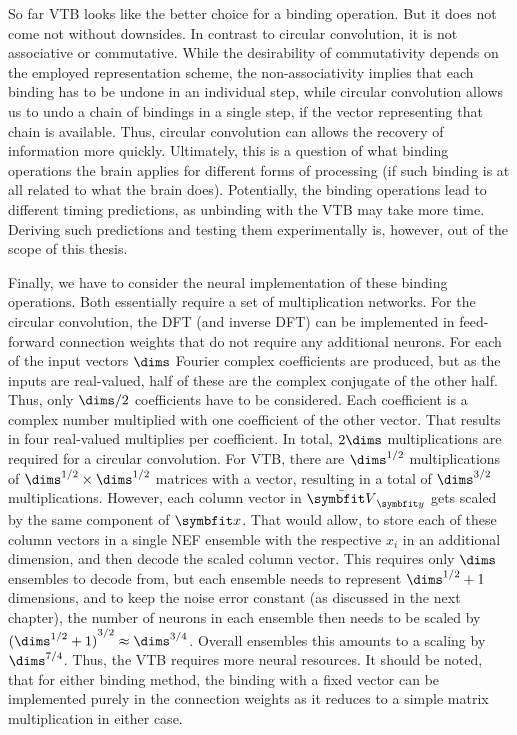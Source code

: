 So far VTB looks like the better choice for a binding operation.
But it does not come not without downsides.
In contrast to circular convolution, it is not associative or commutative.
While the desirability of commutativity depends on the employed representation scheme, the non-associativity implies that each binding has to be undone in an individual step, while circular convolution allows us to undo a chain of bindings in a single step, if the vector representing that chain is available.
Thus, circular convolution can allows the recovery of information more quickly.
Ultimately, this is a question of what binding operations the brain applies for different forms of processing (if such binding is at all related to what the brain does).
Potentially, the binding operations lead to different timing predictions, as unbinding with the VTB may take more time.
Deriving such predictions and testing them experimentally is, however, out of the scope of this thesis.

Finally, we have to consider the neural implementation of these binding operations.
Both essentially require a set of multiplication networks.
For the circular convolution, the DFT (and inverse DFT) can be implemented in feed-forward connection weights that do not require any additional neurons.
For each of the input vectors $\dims$ Fourier complex coefficients are produced, but as the inputs are real-valued, half of these are the complex conjugate of the other half.
Thus, only $\dims / 2$ coefficients have to be considered.
Each coefficient is a complex number multiplied with one coefficient of the other vector.
That results in four real-valued multiplies per coefficient.
In total, $2\dims$ multiplications are required for a circular convolution.
For VTB, there are $\dims^{1/2}$ multiplications of $\dims^{1/2} \times \dims^{1/2}$ matrices with a vector, resulting in a total of $\dims^{3/2}$ multiplications.
However, each column vector in $\bar{\mat V}_{\vc y}$ gets scaled by the same component of $\vc x$.
That would allow, to store each of these column vectors in a single NEF ensemble with the respective $x_i$ in an additional dimension, and then decode the scaled column vector.
This requires only $\dims$ ensembles to decode from, but each ensemble needs to represent $\dims^{1/2} + 1$ dimensions, and to keep the noise error constant (as discussed in the next chapter), the number of neurons in each ensemble then needs to be scaled by ${(\dims^{1/2} + 1)}^{3/2} \approx \dims^{3/4}$.
Overall ensembles this amounts to a scaling by $\dims^{7/4}$.
Thus, the VTB requires more neural resources.
It should be noted, that for either binding method, the binding with a fixed vector can be implemented purely in the connection weights as it reduces to a simple matrix multiplication in either case.

